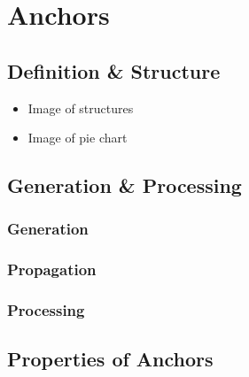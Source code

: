 % 



\chapter{Anchors} \label{ch-anchors}



\section{Definition \& Structure} \label{anc-defn}

\begin{itemize}
    \item Image of structures
    \item Image of pie chart
\end{itemize}



\section{Generation \& Processing}

\subsection{Generation} \label{anc-gen}
\subsection{Propagation} \label{anc-prop}
\subsection{Processing} \label{anc-proc}


\section{Properties of Anchors} \label{anc-properties}

